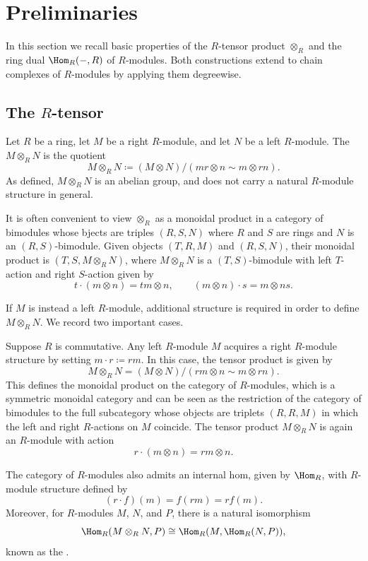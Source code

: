 
\section{Preliminaries} %

In this section we recall basic properties of the $R$-tensor product $\otimes_R$ and the ring dual $\Hom_R(-,R)$ of $R$-modules. Both constructions extend to chain complexes of $R$-modules by applying them degreewise.

\subsection{The $R$-tensor}

Let $R$ be a ring, let $M$ be a right $R$-module, and let $N$ be a left $R$-module. The  $M \otimes_R N$ is the quotient
\[
M \otimes_R N \coloneqq (M \otimes N) \big/ (mr \otimes n \sim m \otimes rn).
\]
As defined, $M \otimes_R N$ is an abelian group, and does not carry a natural $R$-module structure in general.

It is often convenient to view $\otimes_R$ as a monoidal product in a category of bimodules whose bjects are triples $(R,S,N)$ where $R$ and $S$ are rings and $N$ is an $(R,S)$-bimodule. Given objects $(T,R,M)$ and $(R,S,N)$, their monoidal product is $(T,S,M \otimes_R N)$, where $M \otimes_R N$ is a $(T,S)$-bimodule with left $T$-action and right $S$-action given by
\[
t \cdot (m \otimes n) = tm \otimes n,
\qquad
(m \otimes n) \cdot s = m \otimes ns.
\]

If $M$ is instead a left $R$-module, additional structure is required in order to define $M \otimes_R N$. We record two important cases.

\begin{example}
Suppose $R$ is commutative. Any left $R$-module $M$ acquires a right $R$-module structure by setting $m \cdot r \coloneqq rm$. In this case, the tensor product is given by
\[
M \otimes_R N = (M \otimes N) \big/ (rm \otimes n \sim m \otimes rn).
\]
This defines the monoidal product on the category of $R$-modules, which is a symmetric monoidal category and can be seen as the restriction of the category of bimodules to the full subcategory whose objects are triplets $(R,R, M)$ in which the left and right $R$-actions on $M$ coincide. The tensor product $M \otimes_R N$ is again an $R$-module with action
\[
r \cdot (m \otimes n) = rm \otimes n.
\]

The category of $R$-modules also admits an internal hom, given by $\Hom_R$, with $R$-module structure defined by
\[
(r \cdot f)(m) = f(rm) = r f(m).
\]
Moreover, for $R$-modules $M$, $N$, and $P$, there is a natural isomorphism
\[
\Hom_R(M \otimes_R N, P) \cong \Hom_R(M, \Hom_R(N,P)),
\]
known as the .
\end{example}

